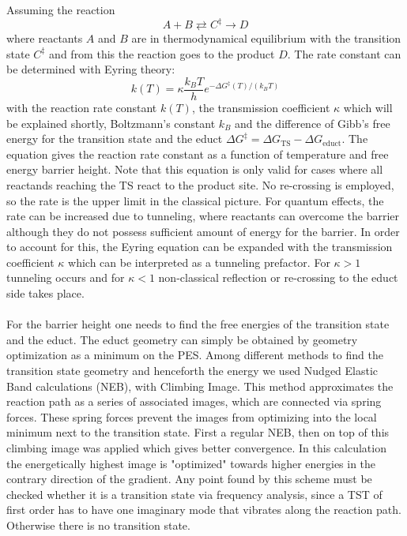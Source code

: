 \documentclass[11pt,DIV=13,BCOR=5mm,a4paper,headinclude]{scrbook}
\begin{document}
Assuming the reaction
\begin{equation}
A+ B \rightleftarrows C^\ddagger \rightarrow D
\end{equation}
where reactants $A$ and $B$ are in thermodynamical equilibrium with the transition state $C^\ddagger$ and from this the reaction goes to the product $D$.
The rate constant can be determined with Eyring theory\cite{eyring,eyring-polanyi}:
\begin{equation}\label{eq:eyring}
k(T)=\kappa\frac{k_BT}{h}e^{-\Delta G^\ddagger(T)/(k_BT)}
\end{equation}
with the reaction rate constant $k(T)$, the transmission coefficient $\kappa$ which will be explained shortly, Boltzmann's constant $k_B$ and the difference of Gibb's free energy for the transition state and the educt $\Delta G^\ddagger = \Delta G_\textrm{TS} - \Delta G_\textrm{educt}$.
The equation gives the reaction rate constant as a function of temperature and free energy barrier height.
Note that this equation is only valid for cases where all reactands reaching the TS react to the product site.
No re-crossing is employed, so the rate is the upper limit in the classical picture.
For quantum effects, the rate can be increased due to tunneling, where reactants can overcome the barrier although they do not possess sufficient amount of energy for the barrier.
In order to account for this, the Eyring equation can be expanded with the transmission coefficient $\kappa$ which can be interpreted as a tunneling prefactor.
For $\kappa>1$ tunneling occurs and for $\kappa<1$ non-classical reflection or re-crossing to the educt side takes place.
\\\\

For the barrier height one needs to find the free energies of the transition state and the educt.
The educt geometry can simply be obtained by geometry optimization as a minimum on the PES.
Among different methods to find the transition state geometry and henceforth the energy we used Nudged Elastic Band calculations (NEB)\cite{Henkelman00a}, with Climbing Image\cite{Henkelman00b}.
This method approximates the reaction path as a series of associated images, which are connected via spring forces.
These spring forces prevent the images from optimizing into the local minimum next to the transition state.
First a regular NEB, then on top of this climbing image was applied which gives better convergence.
In this calculation the energetically highest image is "optimized" towards higher energies in the contrary direction of the gradient.
Any point found by this scheme must be checked whether it is a transition state via frequency analysis, since a TST of first order has to have one imaginary mode that vibrates along the reaction path.
Otherwise there is no transition state.
\end{document}
